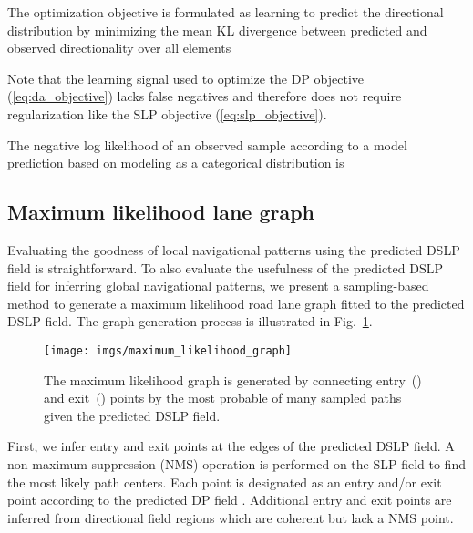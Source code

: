 \documentclass[letterpaper, 10 pt, conference]{ieeeconf}
\begin{document}
The optimization objective  is formulated as learning to predict the directional distribution by minimizing the mean KL divergence between predicted  and observed  directionality over all elements 



Note that the learning signal used to optimize the DP objective (\ref{eq:da_objective}) lacks false negatives and therefore does not require regularization like the SLP objective (\ref{eq:slp_objective}).

The negative log likelihood  of an observed sample  according to a model prediction  based on modeling  as a categorical distribution is 





\subsection{Maximum likelihood lane graph}
\label{seq:maximum_likelihood_path_graph}

Evaluating the goodness of local navigational patterns using the predicted DSLP field is straightforward. To also evaluate the usefulness of the predicted DSLP field for inferring global navigational patterns, we present a sampling-based method to generate a maximum likelihood road lane graph fitted to the predicted DSLP field. The graph generation process is illustrated in Fig.~\ref{fig:maximum_likelihood_graph}.

\begin{figure}\centering
\texttt{[image: imgs/maximum\_likelihood\_graph]}
\vspace{-9mm}
\caption{The maximum likelihood graph is generated by connecting entry~() and exit~() points by the most probable of many sampled paths given the predicted DSLP field.}
\label{fig:maximum_likelihood_graph}
\vspace{-6mm}
\end{figure}

First, we infer entry and exit points at the edges of the predicted DSLP field. A non-maximum suppression (NMS) operation is performed on the SLP field  to find the most likely path centers. Each point is designated as an entry and/or exit point according to the predicted DP field . Additional entry and exit points are inferred from directional field regions which are coherent but lack a NMS point.
\end{document}
